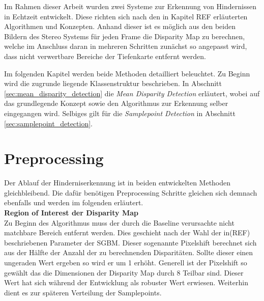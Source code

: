 Im Rahmen dieser Arbeit wurden zwei Systeme zur Erkennung von Hindernissen in Echtzeit entwickelt. Diese richten sich nach den in Kapitel REF erläuterten Algorithmen und Konzepten. Anhand dieser ist es möglich aus den beiden Bildern des Stereo Systems für jeden Frame die Disparity Map zu berechnen, welche im Anschluss daran in mehreren Schritten zunächst so angepasst wird, dass nicht verwertbare Bereiche der Tiefenkarte entfernt werden.

\noindent
Im folgenden Kapitel werden beide Methoden detailliert beleuchtet. Zu Beginn wird die zugrunde liegende Klassenstruktur beschrieben. In Abschnitt \ref{sec:mean_disparity_detection} die \emph{Mean Disparity Detection} erläutert, wobei auf das grundlegende Konzept sowie den Algorithmus zur Erkennung selber eingegangen wird. Selbiges gilt für die \emph{Samplepoint Detection} in Abschnitt \ref{sec:samplepoint_detection}.


\section{Preprocessing}
\label{sec:preprocessing}
Der Ablauf der Hinderniserkennung ist in beiden entwickelten Methoden gleichbleibend. Die dafür benötigen Preprocessing Schritte gleichen sich demnach ebenfalls und werden im folgenden erläutert.\\

\noindent
\textbf{Region of Interest der Disparity Map}\\
Zu Beginn des Algorithmus muss der durch die Baseline verursachte nicht matchbare Bereich entfernt werden. Dies geschieht nach der Wahl der in(REF) beschriebenen Parameter der SGBM. Dieser sogenannte Pixelshift berechnet sich aus der Hälfte der Anzahl der zu berechnenden Disparitäten. Sollte dieser einen ungeraden Wert ergeben so wird er um 1 erhöht. Generell ist der Pixelshift so gewählt das die Dimensionen der Disparity Map durch 8 Teilbar sind. Dieser Wert hat sich während der Entwicklung als robuster Wert erwiesen. Weiterhin dient es zur späteren Verteilung der Samplepoints.\\

